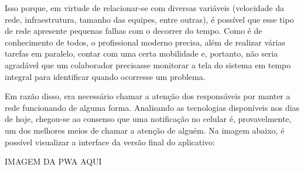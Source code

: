 Isso porque, em virtude de relacionar-se com diversas variáveis (velocidade da rede, infraestrutura, tamanho das equipes, entre outras), é possível que esse tipo de rede apresente pequenas falhas com o decorrer do tempo. Como é de conhecimento de todos, o profissional moderno precisa, além de realizar várias tarefas em paralelo, contar com uma certa mobilidade e, portanto, não seria agradável que um colaborador precisasse monitorar a tela do sistema em tempo integral para identificar quando ocorresse um problema.

Em razão disso, era necessário chamar a atenção dos responsáveis por manter a rede funcionando de alguma forma. Analisando as tecnologias disponíveis nos dias de hoje, chegou-se ao consenso que uma notificação no celular é, provavelmente, um dos melhores meios de chamar a atenção de alguém. Na imagem abaixo, é possível visualizar a interface da versão final do aplicativo:

{\huge IMAGEM DA PWA AQUI}